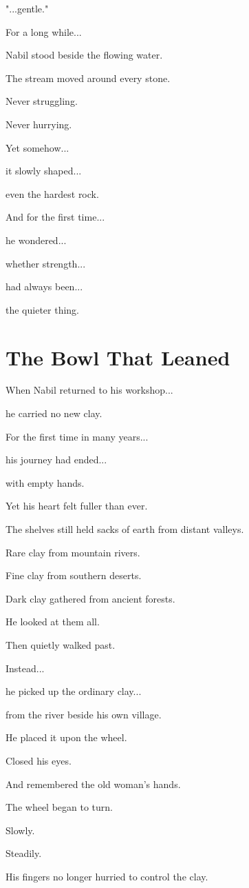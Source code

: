 \documentclass[12pt,openany]{book}
\begin{document}
"...gentle."

For a long while...

Nabil stood beside the flowing water.

The stream moved around every stone.

Never struggling.

Never hurrying.

Yet somehow...

it slowly shaped...

even the hardest rock.

And for the first time...

he wondered...

whether strength...

had always been...

the quieter thing.
\section*{The Bowl That Leaned}

When Nabil returned to his workshop...

he carried no new clay.

For the first time in many years...

his journey had ended...

with empty hands.

Yet his heart felt fuller than ever.

The shelves still held sacks of earth from distant valleys.

Rare clay from mountain rivers.

Fine clay from southern deserts.

Dark clay gathered from ancient forests.

He looked at them all.

Then quietly walked past.

Instead...

he picked up the ordinary clay...

from the river beside his own village.

He placed it upon the wheel.

Closed his eyes.

And remembered the old woman's hands.

The wheel began to turn.

Slowly.

Steadily.

His fingers no longer hurried to control the clay.
\end{document}
